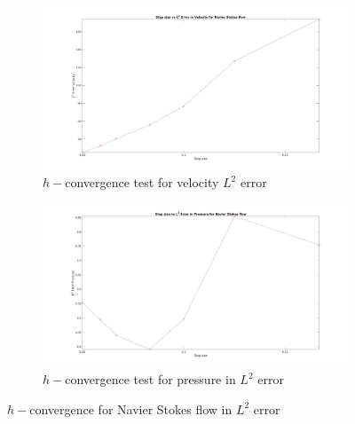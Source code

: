 \documentclass[a4paper,openany]{book}
\begin{document}
\begin{figure}
\begin{subfigure}{\textwidth}	
    \includegraphics[width=\linewidth]{L2_convergence_velocity_n_s.jpg}
    \caption{$h-$convergence test for velocity $L^2$ error}
    \label{fig:vel_navier_stoke_conv}
\end{subfigure}
\begin{subfigure}{\textwidth}	
    \includegraphics[width=\linewidth]{L2_convergence_pressure_n_s.jpg}
  \caption{$h-$convergence test for pressure in $L^2$ error}
  \label{fig:pre_navier_stoke_conv}
\end{subfigure}
\caption{$h-$convergence for Navier Stokes flow in $L^2$ error}
\label{navier_stoke_conv_l2}
\end{figure}
\end{document}
